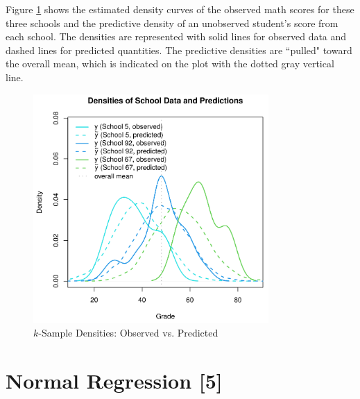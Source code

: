 \documentclass[12pt, a4paper]{article}
\begin{document}
\clearpage

\noindent Figure \ref{fig:NormIGk_DvP} shows the estimated density curves of the observed math scores for these three schools and the predictive density of an unobserved student's score from each school.  The densities are represented with solid lines for observed data and dashed lines for predicted quantities.  The predictive densities are ``pulled" toward the overall mean, which is indicated on the plot with the dotted gray vertical line.

\begin{figure}[h]
  \centering
  \includegraphics[width=0.8\textwidth]{./Graphics/ExamplePlots/NormIGk_Data_v_Prediction}
  \caption{$k$-Sample Densities: Observed vs. Predicted}
  \label{fig:NormIGk_DvP}
\end{figure}




\clearpage


\section{Normal Regression [5]}%

\end{document}
